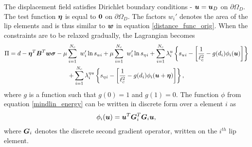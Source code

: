 \documentclass[10pt,review]{cas-sc}
\begin{document}
The displacement field satisfies Dirichlet boundary conditions - $\mbox{\boldmath $u$} = \mbox{\boldmath $u$}_D$ on $\partial \Omega_D$. The test function $\mbox{\boldmath $\eta$}$ is equal to $\bf0$ on $\partial \Omega_D$. The factors $ w_i'$ denotes the area of the lip elements and is thus similar to $ \mbox{\boldmath $w$}$ in equation \eqref{distance_func_orig}. When the constraints are to be relaxed gradually, the Lagrangian becomes
\begin{multline}
	\Pi  = d -\mbox{\boldmath $\eta$} ^T \mbox{\boldmath $B$}^T \mbox{\boldmath $w$} \mbox{\boldmath $\sigma$} - \mu \sum_{i=1}^{N_c} \
	w_i' \ln s_u{_i} + \mu \sum_{i=1}^{N_c} \
	w_i' \ln s_\eta{_i} +\sum_{i=1}^{N_c} \lambda^u_i \left\{ s_u{_i}  - \left[ \frac{1}{\ell_c ^2}- g(d_i)\phi_i(\mbox{\boldmath $u$}) \right]  \right\} \\
	+\sum_{i=1}^{N_c} \lambda^{\eta u}_ i \left\{ s_\eta{_i}  - \left[ \frac{1}{\ell_c ^2}-g(d_i) \phi_i(\mbox{\boldmath $u$}+\mbox{\boldmath $\eta$}) \right]  \right\}, \label{lagrangian_interior_point}
\end{multline}
where $g$ is a function such that $g(0)=1$ and $g(1)=0$. The function $\phi$ from equation \eqref{mindlin_energy} can be written in discrete form over a \added{lip} element $i$ as
\begin{equation}
	\phi_i(\mbox{\boldmath $u$} ) = \mbox{\boldmath $u$} ^T \mbox{\boldmath $G$}_i ^T \mbox{\boldmath $G$}_i \mbox{\boldmath $u$},
\end{equation}
where $\mbox{\boldmath $G$}_i$ denotes the discrete second gradient operator, written on the $i^{th}$ lip element. 
\end{document}
